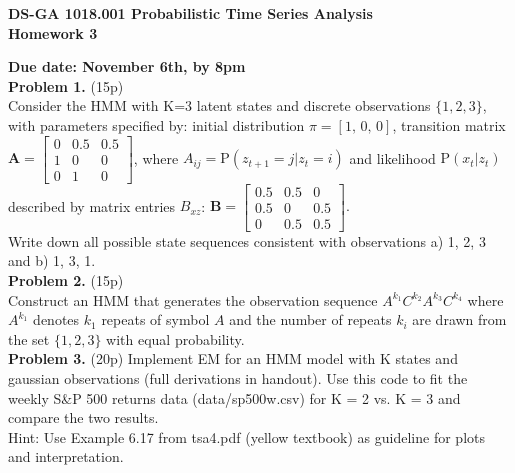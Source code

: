 \documentclass[12pt]{article}
\begin{document}
\thispagestyle{empty}
\begin{center}

\textbf{DS-GA 1018.001  Probabilistic Time Series Analysis\\
Homework 3}
\end{center}

\noindent \textbf{Due date: November 6th, by 8pm}\\


\noindent \textbf{Problem 1.} (15p)\\
Consider the HMM with K=3 latent states and discrete observations $\{1,2,3\}$, with parameters specified by:
initial distribution $\pi = [1, \, 0,\, 0]$, 
transition matrix 
$ \mathbf{A} = \begin{bmatrix}
    0 & 0.5 & 0.5\\
    1 & 0 & 0 \\
    0 & 1 & 0
    \end{bmatrix}
$, where $A_{ij} = \mathrm{P}(z_{t+1}= j | z_t= i)$ 
and likelihood $\mathrm{P}(x_t|z_t)$ described by matrix entries $B_{xz}$:
$ \mathbf{B} =  \begin{bmatrix}
    0.5 & 0.5 & 0 \\
    0.5 & 0 & 0.5 \\
    0 & 0.5 & 0.5
    \end{bmatrix}.
    $\\
 Write down all possible state sequences consistent with observations a) 1, 2, 3 and b) 1, 3, 1.\\

\noindent \textbf{Problem 2.} (15p)\\
Construct an HMM that generates the observation sequence $A^{k_1}C^{k_2}A^{k_3}C^{k_4}$ where $A^{k_1}$ denotes $k_1$ repeats of symbol $A$ and the number of repeats $k_i$ are drawn from the set $\{1,2,3\}$ with equal probability.\\

\noindent \textbf{Problem 3.}  (20p) Implement EM for an HMM model with K states and gaussian observations (full derivations in handout). 
Use this code to fit the weekly S\&P 500 returns data (data/sp500w.csv) for K = 2 vs. K = 3 and compare the two results. \\
Hint: Use Example 6.17 from tsa4.pdf (yellow textbook) as guideline for plots and interpretation.
\end{document}
